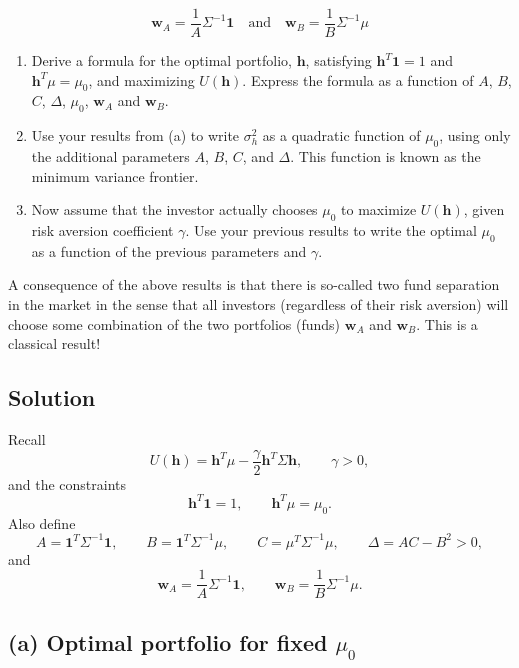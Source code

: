 \documentclass{article}
\begin{document}
\[
\mathbf{w}_A = \frac{1}{A} \Sigma^{-1} \mathbf{1} \quad \text{and} \quad \mathbf{w}_B = \frac{1}{B} \Sigma^{-1} \mu
\]

\begin{enumerate}

\item[(a)] Derive a formula for the optimal portfolio, $\mathbf{h}$, satisfying $\mathbf{h}^T \mathbf{1} = 1$ and $\mathbf{h}^T \mu = \mu_0$, and maximizing $U(\mathbf{h})$. Express the formula as a function of $A$, $B$, $C$, $\Delta$, $\mu_0$, $\mathbf{w}_A$ and $\mathbf{w}_B$.

\item[(b)] Use your results from (a) to write $\sigma_h^2$ as a quadratic function of $\mu_0$, using only the additional parameters $A$, $B$, $C$, and $\Delta$. This function is known as the minimum variance frontier.

\item[(c)] Now assume that the investor actually chooses $\mu_0$ to maximize $U(\mathbf{h})$, given risk aversion coefficient $\gamma$. Use your previous results to write the optimal $\mu_0$ as a function of the previous parameters and $\gamma$.

\end{enumerate}

A consequence of the above results is that there is so-called two fund separation in the market in the sense that all investors (regardless of their risk aversion) will choose some combination of the two portfolios (funds) $\mathbf{w}_A$ and $\mathbf{w}_B$. This is a classical result!


\subsection*{Solution}

Recall
\[
U(\mathbf h)=\mathbf h^{T}\mu-\frac{\gamma}{2}\mathbf h^{T}\Sigma \mathbf h,\qquad \gamma>0,
\]
and the constraints
\[
\mathbf h^{T}\mathbf 1=1,\qquad \mathbf h^{T}\mu=\mu_0.
\]
Also define
\[
A=\mathbf 1^{T}\Sigma^{-1}\mathbf 1,\qquad
B=\mathbf 1^{T}\Sigma^{-1}\mu,\qquad
C=\mu^{T}\Sigma^{-1}\mu,\qquad
\Delta=AC-B^{2}>0,
\]
and
\[
\mathbf w_A=\frac{1}{A}\Sigma^{-1}\mathbf 1,\qquad
\mathbf w_B=\frac{1}{B}\Sigma^{-1}\mu.
\]

\subsection*{(a) Optimal portfolio for fixed $\mu_0$}
\end{document}
